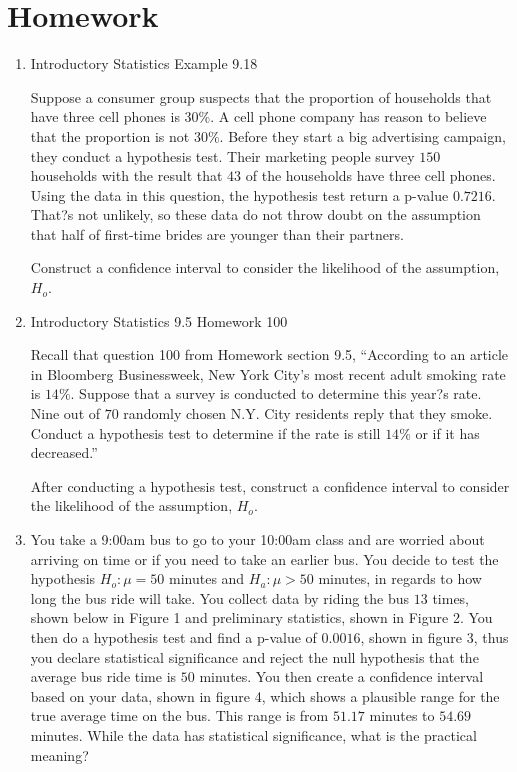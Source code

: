 \section{Homework}

\begin{enumerate}
\item Introductory Statistics Example 9.18

Suppose a consumer group suspects that the proportion of households that have three cell phones is  \(30\%\). A cell phone company has reason to believe that the proportion is not  \(30\%\). Before they start a big advertising campaign, they conduct a hypothesis test. Their marketing people survey  \(150\) households with the result that  \(43\) of the households have three cell phones. Using the data in this question, the hypothesis test return a p-value  \(0.7216\). That?s not unlikely, so these data do not throw doubt on the assumption that half of first-time brides are younger than their partners.

Construct a confidence interval to consider the likelihood of the assumption, \(H_{o}\).


\item Introductory Statistics 9.5 Homework 100

Recall that question 100 from Homework section 9.5, ``According to an article in Bloomberg Businessweek, New York City's most recent adult smoking rate is  \(14\%\). Suppose that a survey is conducted to determine this year?s rate. Nine out of  \(70\) randomly chosen N.Y. City residents reply that they smoke. Conduct a hypothesis test to determine if the rate is still  \(14\%\) or if it has decreased.''

After conducting a hypothesis test, construct a confidence interval to consider the likelihood of the assumption, \(H_{o}\).

\item  You take a 9:00am bus to go to your 10:00am class and are worried about arriving on time or if you need to take an earlier bus. You decide to test the hypothesis \(H_{o}:\mu=50\) minutes and \(H_{a}: \mu>50\) minutes, in regards to how long the bus ride will take. You collect data by riding the bus \(13\) times, shown below in Figure 1 and preliminary statistics, shown in Figure 2. You then do a hypothesis test and find a p-value of  \(0.0016\), shown in figure 3, thus you declare statistical significance and reject the null hypothesis that the average bus ride time is  \(50\) minutes. You then create a confidence interval based on your data, shown in figure 4, which shows a plausible range for the true average time on the bus. This range is from \(51.17\) minutes to \(54.69\) minutes. While the data has statistical significance, what is the practical meaning?
\end{enumerate}